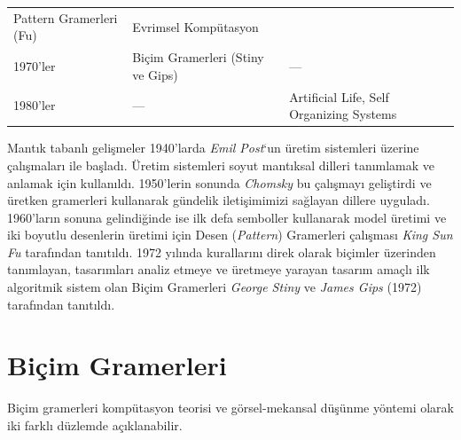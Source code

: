 \documentclass[12pt,turkish,a4paperpaper,]{report}
\begin{document}
\begin{longtable}[]{@{}lll@{}}
\begin{minipage}[t]{0.36\columnwidth}
Pattern Gramerleri (Fu)\strut
\end{minipage} & \begin{minipage}[t]{0.45\columnwidth}\raggedright
Evrimsel Kompütasyon\strut
\end{minipage}\tabularnewline
\begin{minipage}[t]{0.10\columnwidth}\raggedright
1970'ler\strut
\end{minipage} & \begin{minipage}[t]{0.36\columnwidth}\raggedright
Biçim Gramerleri (Stiny ve Gips)\strut
\end{minipage} & \begin{minipage}[t]{0.45\columnwidth}\raggedright
---\strut
\end{minipage}\tabularnewline
\begin{minipage}[t]{0.10\columnwidth}\raggedright
1980'ler\strut
\end{minipage} & \begin{minipage}[t]{0.36\columnwidth}\raggedright
---\strut
\end{minipage} & \begin{minipage}[t]{0.45\columnwidth}\raggedright
Artificial Life, Self Organizing Systems\strut
\end{minipage}\tabularnewline
\bottomrule
\end{longtable}

\newpage

Mantık tabanlı gelişmeler 1940'larda \emph{Emil Post}`un üretim
sistemleri üzerine çalışmaları ile başladı. Üretim sistemleri soyut
mantıksal dilleri tanımlamak ve anlamak için kullanıldı. 1950'lerin
sonunda \emph{Chomsky} bu çalışmayı geliştirdi ve üretken gramerleri
kullanarak gündelik iletişimimizi sağlayan dillere uyguladı. 1960'ların
sonuna gelindiğinde ise ilk defa semboller kullanarak model üretimi ve
iki boyutlu desenlerin üretimi için Desen (\emph{Pattern}) Gramerleri
çalışması \emph{King Sun Fu} tarafından tanıtıldı. 1972 yılında
kurallarını direk olarak biçimler üzerinden tanımlayan, tasarımları
analiz etmeye ve üretmeye yarayan tasarım amaçlı ilk algoritmik sistem
olan Biçim Gramerleri \emph{George Stiny} ve \emph{James Gips} (1972)
tarafından tanıtıldı.

\hypertarget{biuxe7im-gramerleri}{%
\section{Biçim Gramerleri}\label{biuxe7im-gramerleri}}

Biçim gramerleri kompütasyon teorisi ve görsel-mekansal düşünme yöntemi
olarak iki farklı düzlemde açıklanabilir.
\end{document}
